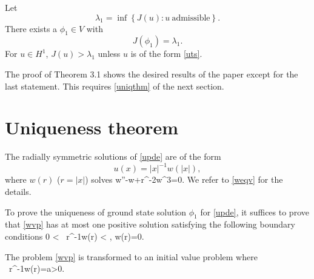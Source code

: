 % 
% 

\begin{theorem}%
Let
    $$\lambda_1 = \inf\left\{J(u): u~\text{admissible}\right\}.$$
    There exists a $\phi_1\in V$ %
    with 
    $$J(\phi_1)=\lambda_1.$$ 
    For $u\in H^1$, $J(u)>\lambda_1$ unless $u$ is of the form \eqref{uts}.
\end{theorem}

The proof of Theorem 3.1 shows the desired results of the paper except for the
last statement. This requires \ref{uniqthm} of the next section.

\section{Uniqueness theorem}
The radially symmetric solutions of \eqref{upde} are of the form
$$u(x)=|x|^{-1}w(|x|),$$ 
where $w(r)$ ($r=|x|$) solves 
\be\label{wvp}
w''-w+r^{-2}w^3=0.
\ee
We refer to \ref{weqv} for the details.

To prove the uniqueness of ground state solution $\phi_1$ for \eqref{upde}, it
suffices to prove that \eqref{wvp} has at most one positive solution satisfying
the following boundary conditions
\be\label{wbc}
0 < ~r^{-1}w(r) < \infty,\quad
{} w(r)=0.
\ee

The problem \eqref{wvp} is transformed to an initial value problem where 
\be\label{wic}
~r^{-1}w(r)=a>0.
\ee

